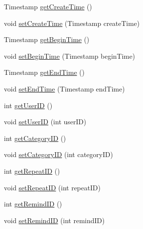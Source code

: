 \begin{DoxyCompactItemize}
\item 
Timestamp \hyperlink{classcom_1_1github_1_1walterfan_1_1gtd_1_1model_1_1Task_a54fe391f305709f61aeace1d597d4383}{get\-Create\-Time} ()
\item 
void \hyperlink{classcom_1_1github_1_1walterfan_1_1gtd_1_1model_1_1Task_a2b316bb20e25c3ec065fc9e4f7059c23}{set\-Create\-Time} (Timestamp create\-Time)
\item 
Timestamp \hyperlink{classcom_1_1github_1_1walterfan_1_1gtd_1_1model_1_1Task_a9a3fb9c8f8b044f8fdc155a7c437995f}{get\-Begin\-Time} ()
\item 
void \hyperlink{classcom_1_1github_1_1walterfan_1_1gtd_1_1model_1_1Task_a1776b1841bbef0b6b88b714704fe89e3}{set\-Begin\-Time} (Timestamp begin\-Time)
\item 
Timestamp \hyperlink{classcom_1_1github_1_1walterfan_1_1gtd_1_1model_1_1Task_ac9a8851fb16d0ceeca479095a0bd984f}{get\-End\-Time} ()
\item 
void \hyperlink{classcom_1_1github_1_1walterfan_1_1gtd_1_1model_1_1Task_a754690b4dca6d8e1ad5e04dc83cad754}{set\-End\-Time} (Timestamp end\-Time)
\item 
int \hyperlink{classcom_1_1github_1_1walterfan_1_1gtd_1_1model_1_1Task_aac748862b11c8ec34537dd375fbed121}{get\-User\-I\-D} ()
\item 
void \hyperlink{classcom_1_1github_1_1walterfan_1_1gtd_1_1model_1_1Task_a8e01883c4b75badddb9473d43e998552}{set\-User\-I\-D} (int user\-I\-D)
\item 
int \hyperlink{classcom_1_1github_1_1walterfan_1_1gtd_1_1model_1_1Task_a1d15293987c115254a1d5711fe681e39}{get\-Category\-I\-D} ()
\item 
void \hyperlink{classcom_1_1github_1_1walterfan_1_1gtd_1_1model_1_1Task_a0f2ccbf29bdeda41d8907567940cfec0}{set\-Category\-I\-D} (int category\-I\-D)
\item 
int \hyperlink{classcom_1_1github_1_1walterfan_1_1gtd_1_1model_1_1Task_a6334be40340ec191f334c9557fa134fc}{get\-Repeat\-I\-D} ()
\item 
void \hyperlink{classcom_1_1github_1_1walterfan_1_1gtd_1_1model_1_1Task_a7bfadd819620e6bfe35023f23e2da14b}{set\-Repeat\-I\-D} (int repeat\-I\-D)
\item 
int \hyperlink{classcom_1_1github_1_1walterfan_1_1gtd_1_1model_1_1Task_a6122723e306af4bdd9cf944e2a03553c}{get\-Remind\-I\-D} ()
\item 
void \hyperlink{classcom_1_1github_1_1walterfan_1_1gtd_1_1model_1_1Task_a8227d6ef7922ff0d82cbca5936d355d6}{set\-Remind\-I\-D} (int remind\-I\-D)
\end{DoxyCompactItemize}
